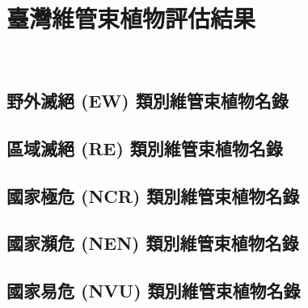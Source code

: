\chapter{臺灣維管束植物評估結果}

\begin{Kai}

\linespread{1.5}\selectfont

\quad \\
\end{Kai}

\linespread{1}\selectfont
    \section{野外滅絕 (EW) 類別維管束植物名錄}
    \begin{footnotesize}
    
    \end{footnotesize}
    \section{區域滅絕 (RE) 類別維管束植物名錄}
    \begin{footnotesize}
    
    \end{footnotesize}
    \section{國家極危 (NCR) 類別維管束植物名錄}
    
    \section{國家瀕危 (NEN) 類別維管束植物名錄}
    
    \section{國家易危 (NVU) 類別維管束植物名錄}
    

